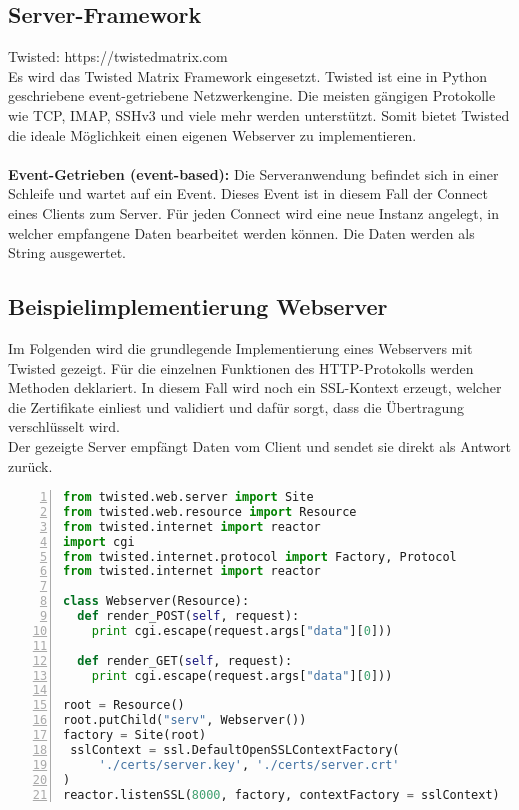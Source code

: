 \subsection{Server-Framework}
Twisted: https://twistedmatrix.com \\
Es wird das Twisted Matrix Framework eingesetzt. Twisted ist eine in Python geschriebene event-getriebene Netzwerkengine. Die meisten gängigen Protokolle wie TCP, IMAP, SSHv3 und viele mehr werden unterstützt. Somit bietet Twisted die ideale Möglichkeit einen eigenen Webserver zu implementieren. \\\\
\textbf{Event-Getrieben (event-based):} Die Serveranwendung befindet sich in einer Schleife und wartet auf ein Event. Dieses Event ist in diesem Fall der Connect eines Clients zum Server. Für jeden Connect wird eine neue Instanz angelegt, in welcher empfangene Daten bearbeitet werden können. Die Daten werden als String ausgewertet.

\subsection{Beispielimplementierung Webserver}
Im Folgenden wird die grundlegende Implementierung eines Webservers mit Twisted gezeigt. Für die einzelnen Funktionen des HTTP-Protokolls werden Methoden deklariert. In diesem Fall wird noch ein SSL-Kontext erzeugt, welcher die Zertifikate einliest und validiert und dafür sorgt, dass die Übertragung verschlüsselt wird. \\
Der gezeigte Server empfängt Daten vom Client und sendet sie direkt als Antwort zurück.

\begin{lstlisting}[caption =Testcode Echoserver mit Twisted Framework, language=python, frame=single, breaklines=true,columns=fullflexible, commentstyle=\color{gray}\upshape, captionpos=b, numbers = left]
from twisted.web.server import Site
from twisted.web.resource import Resource
from twisted.internet import reactor
import cgi
from twisted.internet.protocol import Factory, Protocol
from twisted.internet import reactor

class Webserver(Resource):
  def render_POST(self, request):
	print cgi.escape(request.args["data"][0]))

  def render_GET(self, request):
	print cgi.escape(request.args["data"][0]))

root = Resource()
root.putChild("serv", Webserver())
factory = Site(root)
 sslContext = ssl.DefaultOpenSSLContextFactory(
     './certs/server.key', './certs/server.crt'
)
reactor.listenSSL(8000, factory, contextFactory = sslContext)
\end{lstlisting}




